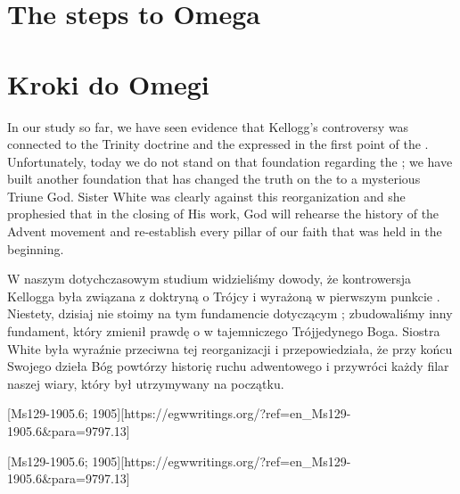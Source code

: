 \chapter{The steps to Omega}


\chapter{Kroki do Omegi}


In our study so far, we have seen evidence that Kellogg’s controversy was connected to the Trinity doctrine and the  expressed in the first point of the . Unfortunately, today we do not stand on that foundation regarding the ; we have built another foundation that has changed the truth on the  to a mysterious Triune God. Sister White was clearly against this reorganization and she prophesied that in the closing of His work, God will rehearse the history of the Advent movement and re-establish every pillar of our faith that was held in the beginning.


W naszym dotychczasowym studium widzieliśmy dowody, że kontrowersja Kellogga była związana z doktryną o Trójcy i  wyrażoną w pierwszym punkcie . Niestety, dzisiaj nie stoimy na tym fundamencie dotyczącym ; zbudowaliśmy inny fundament, który zmienił prawdę o  w tajemniczego Trójjedynego Boga. Siostra White była wyraźnie przeciwna tej reorganizacji i przepowiedziała, że przy końcu Swojego dzieła Bóg powtórzy historię ruchu adwentowego i przywróci każdy filar naszej wiary, który był utrzymywany na początku.


[Ms129-1905.6; 1905][https://egwwritings.org/?ref=en\_Ms129-1905.6&para=9797.13]


[Ms129-1905.6; 1905][https://egwwritings.org/?ref=en\_Ms129-1905.6&para=9797.13]


